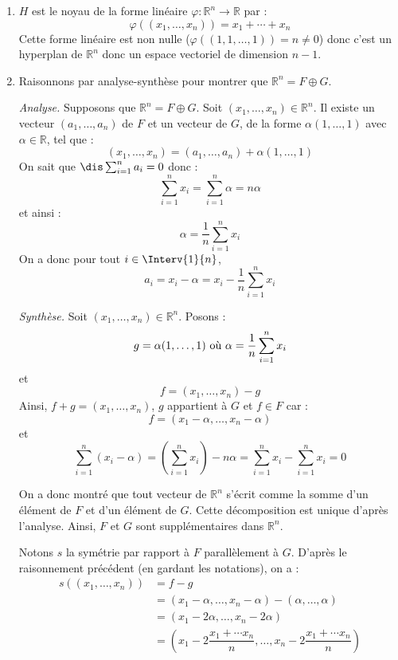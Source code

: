 \documentclass[a4paper,10pt]{report}
\begin{document}
\corr

\begin{enumerate}
\item $H$ est le noyau de la forme linéaire $\varphi : \mathbb{R}^n \rightarrow \mathbb{R}$ par :
$$ \varphi((x_1, \ldots, x_n))=  x_1 + \cdots + x_n$$
Cette forme linéaire est non nulle ($\varphi((1,1, \ldots, 1)) = n \neq 0$) donc c'est un hyperplan de $\mathbb{R}^n$ donc un espace vectoriel de dimension $n-1$.
\item Raisonnons par analyse-synthèse pour montrer que $\mathbb{R}^n = F \oplus G$.

\medskip

\noindent \textit{Analyse.} Supposons que $\mathbb{R}^n = F \oplus G$. Soit $(x_1, \ldots, x_n) \in \mathbb{R}^n$. Il existe un vecteur $(a_1, \ldots, a_n)$ de $F$ et un vecteur de $G$, de la forme $\alpha (1, \ldots, 1)$ avec $\alpha \in \mathbb{R}$, tel que :
$$ (x_1, \ldots, x_n) = (a_1, \ldots, a_n) + \alpha (1, \ldots, 1)$$
On sait que $\dis \sum_{i=1}^n a_i=0$ donc :
$$ \sum_{i=1}^n x_i = \sum_{i=1}^n \alpha = n \alpha$$
et ainsi :
$$ \alpha = \dfrac{1}{n} \sum_{i=1}^n x_i $$
On a donc pour tout $i \in \Interv{1}{n}$,
$$ a_i = x_i - \alpha = x_i - \dfrac{1}{n} \sum_{i=1}^n x_i$$

\medskip

\noindent \textit{Synthèse.} Soit $(x_1, \ldots , x_n) \in \mathbb{R}^n$. Posons :
$$ g = \alpha (1, \ldots, 1) \hbox{ où } \alpha =  \dfrac{1}{n} \sum_{i=1}^n x_i$$
et 
$$ f = (x_1, \ldots, x_n) - g$$
Ainsi, $f+g= (x_1, \ldots, x_n)$, $g$ appartient à $G$ et $f \in F$ car :
$$ f = (x_1-\alpha, \ldots, x_n - \alpha)$$
et
$$ \sum_{i=1}^n (x_i - \alpha)  = \left(\sum_{i=1}^n x_i \right) - n \alpha = \sum_{i=1}^n x_i- \sum_{i=1}^n x_i = 0$$

\medskip

\noindent On a donc montré que tout vecteur de $\mathbb{R}^n$ s'écrit comme la somme d'un élément de $F$ et d'un élément de $G$. Cette décomposition est unique d'après l'analyse. Ainsi, $F$ et $G$ sont supplémentaires dans $\mathbb{R}^n$.

\medskip

\noindent Notons $s$ la symétrie par rapport à $F$ parallèlement à $G$. D'après le raisonnement précédent (en gardant les notations), on a :
\begin{align*}
s((x_1, \ldots, x_n)) & = f-g \\
& = (x_1-\alpha, \ldots, x_n - \alpha) - (\alpha, \ldots, \alpha) \\
& = (x_1 - 2\alpha, \ldots, x_n -2 \alpha) \\
& = \left( x_1 - 2 \dfrac{x_1+ \cdots x_n}{n}, \ldots,  x_n - 2 \dfrac{x_1+ \cdots x_n}{n}\right) 
\end{align*}
\end{enumerate}
\end{document}

